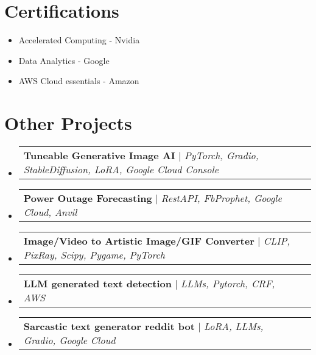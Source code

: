 \documentclass[letterpaper,11pt]{article}
\makeatletter
\newcommand{\resumeProjectHeading}[2]{
    \item
    \begin{tabular*}{1.001\textwidth}{l@{\extracolsep{\fill}}r}
      \small#1 & \textbf{\small #2}\\
    \end{tabular*}\vspace{-7pt}
}
\newcommand{\resumeSubHeadingListStart}{\begin{itemize}[leftmargin=0.0in, label={}]}
\newcommand{\resumeSubHeadingListEnd}{\end{itemize}}
\makeatother
\begin{document}
\section{\textcolor{myColor1}{Certifications}}
        \begin{multicols}{3}
            \begin{itemize}[itemsep=3pt, parsep=3pt]%
                \item\small \textcolor{myColor2}{Accelerated Computing - Nvidia}
                \item\small \textcolor{myColor2}{Data Analytics - Google}
                \item\small \textcolor{myColor2}{AWS Cloud essentials - Amazon}
            \end{itemize}
        \end{multicols}
        \vspace*{2.0\multicolsep}  
\section{\textcolor{myColor1}{Other Projects}}
    \vspace{-7pt}
    \resumeSubHeadingListStart
      \resumeProjectHeading
          {\textbf{\textcolor{myColor2}{Tuneable Generative Image AI}} $|$ \emph{{PyTorch, Gradio, StableDiffusion, LoRA, Google Cloud Console}}}{}\vspace{-15pt}
          \vspace{-14pt}
      \resumeProjectHeading
          {\textbf{\textcolor{myColor2}{Power Outage Forecasting}} $|$ \emph{{RestAPI, FbProphet, Google Cloud, Anvil}}}{}\vspace{-15pt}
          \vspace{-14pt}
      \resumeProjectHeading
          {\textbf{\textcolor{myColor2}{Image/Video to Artistic Image/GIF Converter}} $|$ \emph{{CLIP, PixRay, Scipy, Pygame, PyTorch}}}{}\vspace{-15pt}
          \vspace{-14pt}
      \resumeProjectHeading
          {\textbf{\textcolor{myColor2}{LLM generated text detection}} $|$ \emph{{LLMs, Pytorch, CRF, AWS}}}{}\vspace{-15pt}
          \vspace{-14pt}    
      \resumeProjectHeading
          {\textbf{\textcolor{myColor2}{Sarcastic text generator reddit bot}} $|$ \emph{{LoRA, LLMs, Gradio, Google Cloud}}}{}\vspace{-15pt} 
    \resumeSubHeadingListEnd
\vspace{-14pt}
\end{document}

